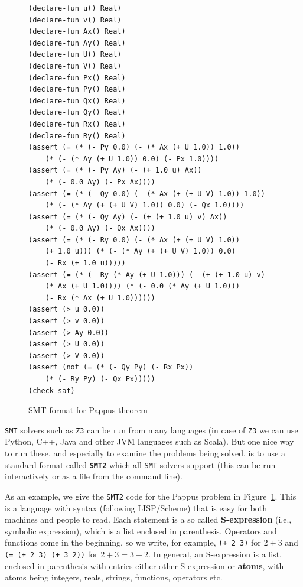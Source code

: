 \documentclass{amsart}
\theoremstyle{plain}
\theoremstyle{definition}
\theoremstyle{remark}
\begin{document}
\begin{figure}
	\begin{lstlisting}[language=LISP, frame=single]
(declare-fun u() Real)
(declare-fun v() Real)
(declare-fun Ax() Real)
(declare-fun Ay() Real)
(declare-fun U() Real)
(declare-fun V() Real)
(declare-fun Px() Real)
(declare-fun Py() Real)
(declare-fun Qx() Real)
(declare-fun Qy() Real)
(declare-fun Rx() Real)
(declare-fun Ry() Real)
(assert (= (* (- Py 0.0) (- (* Ax (+ U 1.0)) 1.0)) 
	(* (- (* Ay (+ U 1.0)) 0.0) (- Px 1.0))))
(assert (= (* (- Py Ay) (- (+ 1.0 u) Ax)) 
	(* (- 0.0 Ay) (- Px Ax))))
(assert (= (* (- Qy 0.0) (- (* Ax (+ (+ U V) 1.0)) 1.0)) 
	(* (- (* Ay (+ (+ U V) 1.0)) 0.0) (- Qx 1.0))))
(assert (= (* (- Qy Ay) (- (+ (+ 1.0 u) v) Ax)) 
	(* (- 0.0 Ay) (- Qx Ax))))
(assert (= (* (- Ry 0.0) (- (* Ax (+ (+ U V) 1.0)) 
	(+ 1.0 u))) (* (- (* Ay (+ (+ U V) 1.0)) 0.0) 
	(- Rx (+ 1.0 u)))))
(assert (= (* (- Ry (* Ay (+ U 1.0))) (- (+ (+ 1.0 u) v) 
	(* Ax (+ U 1.0)))) (* (- 0.0 (* Ay (+ U 1.0))) 
	(- Rx (* Ax (+ U 1.0))))))
(assert (> u 0.0))
(assert (> v 0.0))
(assert (> Ay 0.0))
(assert (> U 0.0))
(assert (> V 0.0))
(assert (not (= (* (- Qy Py) (- Rx Px)) 
	(* (- Ry Py) (- Qx Px)))))
(check-sat)
\end{lstlisting}
	\caption{SMT format for Pappus theorem}\label{smt-pappus}
\end{figure}

\texttt{SMT} solvers such as \texttt{Z3} can be run from many languages (in case of \texttt{Z3} we
can use Python, C++, Java and other JVM languages such as Scala). But
one nice way to run these, and especially to examine the problems being
solved, is to use a standard format called \textbf{\texttt{SMT2}} which all \texttt{SMT}
solvers support (this can be run interactively or as a file from the
command line).

As an example, we give the \texttt{SMT2} code for the Pappus problem in Figure~\ref{smt-pappus}. This is a language
with syntax (following LISP/Scheme) that is easy for both machines and
people to read. Each statement is a so called \textbf{S-expression}
(i.e., symbolic expression), which is a list enclosed in parenthesis.
Operators and functions come in the beginning, so we write, for example,
\texttt{(+\ 2\ 3)} for \(2 + 3\) and \texttt{(=\ (+\ 2\ 3)\ (+\ 3\ 2))}
for \(2 + 3 = 3 + 2\). In general, an S-expression is a list, enclosed
in parenthesis with entries either other S-expression or \textbf{atoms},
with atoms being integers, reals, strings, functions, operators etc.
\end{document}
